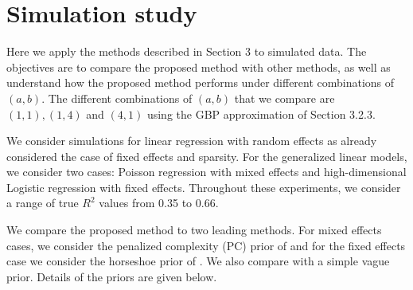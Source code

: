 \documentclass[12pt]{article}
\begin{document}
\section{Simulation study}\label{s:sim}

Here we apply the methods described in Section 3 to simulated data. The objectives are to compare the proposed method with other methods, as well as understand how the proposed method performs under different combinations of $(a,b)$. The different combinations of $(a,b)$ that we compare are $(1,1), (1,4)$ and $(4,1)$ using the GBP approximation of Section 3.2.3.


We consider simulations for linear regression with random effects as \cite{zhang2022bayesian} already considered the case of fixed effects and sparsity. For the generalized linear models, we consider two cases: Poisson regression with mixed effects and high-dimensional Logistic regression with fixed effects. Throughout these experiments, we consider a range of true $R^2$ values from 0.35 to 0.66.

We compare the proposed method to two leading methods. For mixed effects cases, we consider the penalized complexity (PC) prior of \cite{simpson2017penalising} and for the fixed effects case we consider the horseshoe prior of \cite{carvalho2010}. We also compare with a simple vague prior. Details of the priors are given below.

\begin{comment}
In Figure \ref{fig:pcp/horse} we simulate the prior $R^2$ that these methods induce. Notice that the mean prior $R^2$ increases as the number of terms $p+q$ increases for both methods as opposed to the proposed method which keeps the same distribution regardless of the number of parameters in the model. In particular, both PCP and Horseshoe nearly induce a prior point mass at $R^2=1$ for the Gaussian and Poisson case when $p+q=50$.

\begin{figure}
    \centering
    \texttt{[image: figs/pcp.horse.priorR2.pdf]}
    \caption{Prior distribution of $R^2$ induced by PCP and Horseshoe prior distributions for Gaussian, Poisson and Logistic regression with $p+q=1,50$.}
    \label{fig:pcp/horse}
\end{figure}
\end{comment}
\end{document}

